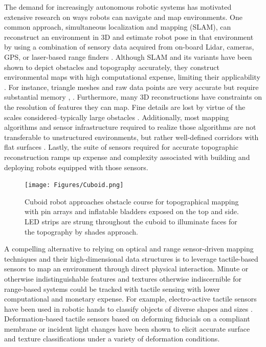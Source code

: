 \documentclass[letterpaper, 12 pt, conference]{ieeeconf}  %
\begin{document}
The demand for increasingly autonomous robotic systems has motivated extensive research on ways robots can navigate and map environments. One common approach, simultaneous localization and mapping (SLAM), can reconstruct an environment in 3D and estimate robot pose in that environment by using a combination of sensory data acquired from on-board Lidar, cameras, GPS, or laser-based range finders \cite{SLAM_intro}. Although SLAM and its variants have been shown to depict obstacles and topography accurately, they construct environmental maps with high computational expense, limiting their applicability \cite{3D_mapping}. For instance, triangle meshes and raw data points are very accurate but require substantial memory \cite{triangle_mesh1}, \cite{triangle_mesh2}. Furthermore, many 3D reconstructions have constraints on the resolution of features they can map. Fine details are lost by virtue of the scales considered--typically large obstacles \cite{mapping_survey}. Additionally, most mapping algorithms and sensor infrastructure required to realize those algorithms are not transferable to unstructured environments, but rather well-defined corridors with flat surfaces \cite{mapping_survey}. Lastly, the suite of sensors required for accurate topographic reconstruction ramps up expense and complexity associated with building and deploying robots equipped with those sensors. 

 \begin{figure}
 \centering
 \texttt{[image: Figures/Cuboid.png]}
 \caption{Cuboid robot approaches obstacle course for topographical mapping with pin arrays and inflatable bladders exposed on the top and side. LED strips are strung throughout the cuboid to illuminate faces for the topography by shades approach. }
 \label{fig:operate} 
 \end{figure}
 
A compelling alternative to relying on optical and range sensor-driven mapping techniques and their high-dimensional data structures is to leverage tactile-based sensors to map an environment through direct physical interaction.  Minute or otherwise indistinguishable features and textures otherwise indiscernible for range-based systems could be tracked with tactile sensing with lower computational and monetary expense. For example, electro-active tactile sensors have been used in robotic hands to classify objects of diverse shapes and sizes \cite{tactile_robot_hand}. Deformation-based tactile sensors based on deforming fiducials on a compliant membrane \cite{tacile_sense_fiducial} or incident light changes \cite{tactile_sense_light} have been shown to elicit accurate surface and texture classifications under a variety of deformation conditions.  
\end{document}
